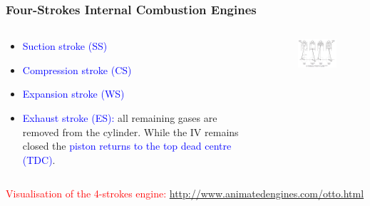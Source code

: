 \documentclass[10pt,compress]{beamer}
\begin{document}
\begin{frame}
 \frametitle{Four-Strokes Internal Combustion Engines}
  \begin{columns}
   \begin{column}[c]{0.4\linewidth}
    \begin{itemize}
     \item <1-> \textcolor{blue}{Suction stroke (SS)} 
     \item <1-> \textcolor{blue}{Compression stroke (CS)} 
     \item <1-> \textcolor{blue}{Expansion stroke (WS)} 
     \item <1-> \textcolor{blue}{Exhaust stroke (ES):} all remaining gases are removed from the cylinder. While the IV remains closed the \textcolor{blue}{piston returns to the top dead centre (TDC)}.
    \end{itemize}
   \end{column}
   \begin{column}[c]{0.6\linewidth}
    \begin{figure}%
     \begin{center}
      \includegraphics[width=7.5cm,clip]{./Pics/InternalCombustion_4Strokes_Otto}
     \end{center}
    \end{figure}  
   \end{column}  
  \end{columns}
\textcolor{red}{Visualisation of the 4-strokes engine: \href{http://www.animatedengines.com/otto.html}{http://www.animatedengines.com/otto.html} }
\end{frame}
\end{document}
